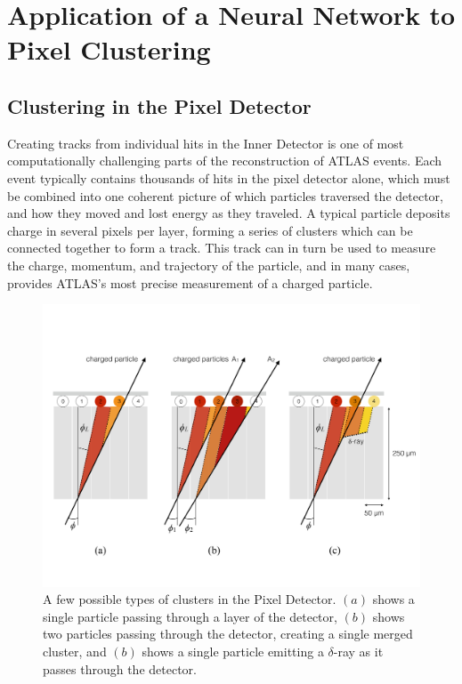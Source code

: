 
\chapter{Application of a Neural Network to Pixel Clustering} %

\label{ch:nn} %



\section{Clustering in the Pixel Detector}

Creating tracks from individual hits in the Inner Detector is one of most computationally challenging parts of the reconstruction of ATLAS events. Each event typically contains thousands of hits in the pixel detector alone, which must be combined into one coherent picture of which particles traversed the detector, and how they moved and lost energy as they traveled. A typical particle deposits charge in several pixels per layer, forming a series of clusters which can be connected together to form a track. This track can in turn be used to measure the charge, momentum, and trajectory of the particle, and in many cases, provides ATLAS's most precise measurement of a charged particle. 


\begin{centering}
\begin{figure}[bth]
\myfloatalign
\includegraphics[width=.90\linewidth]{figures/nn/cluster_types.pdf}
\caption{A few possible types of clusters in the Pixel Detector. $(a)$ shows a single particle passing through a layer of the detector, $(b)$ shows two particles passing through the detector, creating a single merged cluster, and $(b)$ shows a single particle emitting a $\delta$-ray as it passes through the detector.}
\label{fig:cluster_types}
\end{figure}
\end{centering}

